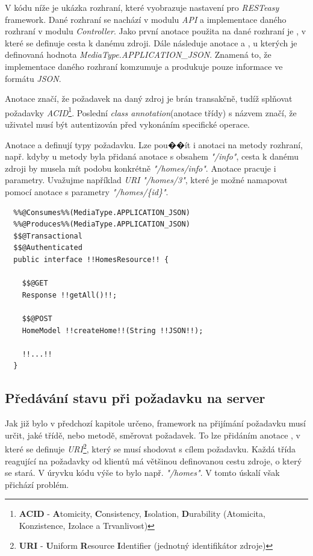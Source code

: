 V kódu níže je ukázka rozhraní, které vyobrazuje nastavení pro \emph{RESTeasy} framework.
Dané rozhraní se nachází v modulu \emph{API} a implementace daného rozhraní v modulu \emph{Controller}.
Jako první anotace použita na dané rozhraní je , v které se definuje cesta k danému zdroji.
Dále následuje anotace  a , u kterých je definovaná hodnota \emph{MediaType.APPLICATION\_JSON}.
Znamená to, že implementace daného rozhraní komzumuje a produkuje pouze informace ve formátu \emph{JSON}.

Anotace  značí, že požadavek na daný zdroj je brán transakčně, tudíž splňovat požadavky \emph{ACID}\footnote{\textbf{ACID} - \textbf{A}tomicity, \textbf{C}onsistency, \textbf{I}solation, \textbf{D}urability (Atomicita, Konzistence, Izolace a Trvanlivost)}.
Poslední \emph{class annotation}(anotace třídy) s názvem  značí, že uživatel musí být autentizován před vykonáním specifické operace.

Anotace  a  definují typy požadavku.
Lze pou��ít i anotaci  na metody rozhraní, např. kdyby u metody byla přidaná anotace  s obsahem \emph{"/info"}, cesta k danému zdroji
by musela mít podobu konkrétně \emph{"/homes/info"}.
Anotace  pracuje i parametry.
Uvažujme například \emph{URI} \emph{"/homes/3"}, které je možné namapovat pomocí anotace  s parametry \emph{"/homes/\{id\}"}.

\begin{lstlisting}[style=JavaStyle, caption={Ukázka deklarování rozhraní pro správu domácností}]
  %%@Path%%("/homes")
  %%@Consumes%%(MediaType.APPLICATION_JSON)
  %%@Produces%%(MediaType.APPLICATION_JSON)
  $$@Transactional
  $$@Authenticated
  public interface !!HomesResource!! {

    $$@GET
    Response !!getAll()!!;

    $$@POST
    HomeModel !!createHome!!(String !!JSON!!);

    !!...!!
  }
\end{lstlisting}

\newpage
\subsection*{Předávání stavu při požadavku na server}
\label{impl:backend:state}

Jak již bylo v předchozí kapitole určeno, framework na přijímání požadavku musí určit, jaké třídě, nebo metodě, směrovat požadavek.
To lze přidáním anotace , v které se definuje \emph{URI}\footnote{\textbf{URI} - \textbf{U}niform \textbf{R}esource \textbf{I}dentifier (jednotný identifikátor zdroje)}, který se musí shodovat s cílem požadavku.
Každá třída reagující na požadavky od klientů má většinou definovanou cestu zdroje, o který se stará.
V úryvku kódu výše to bylo např. \emph{"/homes"}.
V tomto úskalí však přichází problém.

